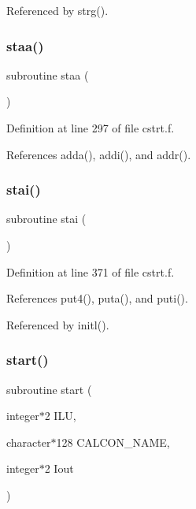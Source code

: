Referenced by strg().

\mbox{\label{cstrt_8f_a5da3e664810d4e9fe357e1844112d700}} 
\subsubsection{\texorpdfstring{staa()}{staa()}}
{\footnotesize\ttfamily subroutine staa (\begin{DoxyParamCaption}{ }\end{DoxyParamCaption})}



Definition at line 297 of file cstrt.\+f.



References adda(), addi(), and addr().

\mbox{\label{cstrt_8f_ad365dc373957ba95ed3fde84a24fe241}} 
\subsubsection{\texorpdfstring{stai()}{stai()}}
{\footnotesize\ttfamily subroutine stai (\begin{DoxyParamCaption}{ }\end{DoxyParamCaption})}



Definition at line 371 of file cstrt.\+f.



References put4(), puta(), and puti().



Referenced by initl().

\mbox{\label{cstrt_8f_a5550f04f7873053b05b0ae19f16d2a91}} 
\subsubsection{\texorpdfstring{start()}{start()}}
{\footnotesize\ttfamily subroutine start (\begin{DoxyParamCaption}\item[{integer$\ast$2}]{I\+LU,  }\item[{character$\ast$128}]{C\+A\+L\+C\+O\+N\+\_\+\+N\+A\+ME,  }\item[{integer$\ast$2}]{Iout }\end{DoxyParamCaption})}



